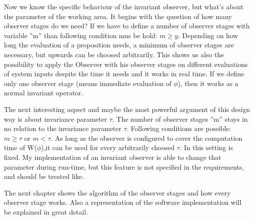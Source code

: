 Now we know the specific behaviour of the invariant observer, but what's about the parameter of
the working area. It begins with the question of how many observer stages do we need?
If we have to define a number of observer stages with variable ''m'' than following condition mus be hold: $m \ge y$.
Depending on how long the evaluation of a proposition needs, a minimum of observer stages are necessary, but upwards 
can be choosed arbitrarily. This shows us also the possibility to apply the Observer with his observer stages
on different evaluations of system inputs despite the time it needs and it works in real time.
If we define only one observer stage (means immediate evaluation of $\phi$), then it works as a normal invariant operator.\newline

The next interesting aspect and maybe the most powerful argument of this design way is about invariance parameter $\tau$.
The number of observer stages ''m'' stays in no relation to the invariance parameter $\tau$. Following conditions are possible:
$m \ge \tau$ or $m < \tau$. As long as the observer is configured to cover the computation time of W($\phi$),it can be
used for every arbitrarily choosed $\tau$. In \cite{RTFMBJ13} this setting is fixed.
My implementation of an invariant observer is able to change that parameter during run-time, but this feature is not 
specified in the requirements, and should be treated like.\newline

The next chapter shows the algorithm of the observer stages and how every observer stage works. 
Also a representation of the software implementation will be explained in great detail.


